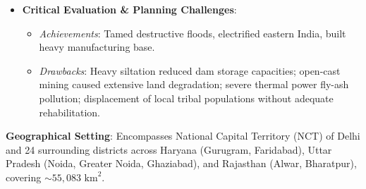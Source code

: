 \documentclass[11pt,a4paper]{article}
\begin{document}
\begin{itemize}[leftmargin=*]
  \item \textbf{Critical Evaluation \& Planning Challenges}:
  \begin{itemize}
    \item \textit{Achievements}: Tamed destructive floods, electrified eastern India, built heavy manufacturing base.
    \item \textit{Drawbacks}: Heavy siltation reduced dam storage capacities; open-cast mining caused extensive land degradation; severe thermal power fly-ash pollution; displacement of local tribal populations without adequate rehabilitation.
  \end{itemize}
\end{itemize}

\begin{casebox}
\textbf{Geographical Setting}: Encompasses National Capital Territory (NCT) of Delhi and 24 surrounding districts across Haryana (Gurugram, Faridabad), Uttar Pradesh (Noida, Greater Noida, Ghaziabad), and Rajasthan (Alwar, Bharatpur), covering $\sim 55,083 \text{ km}^2$.
\end{casebox}
\end{document}
